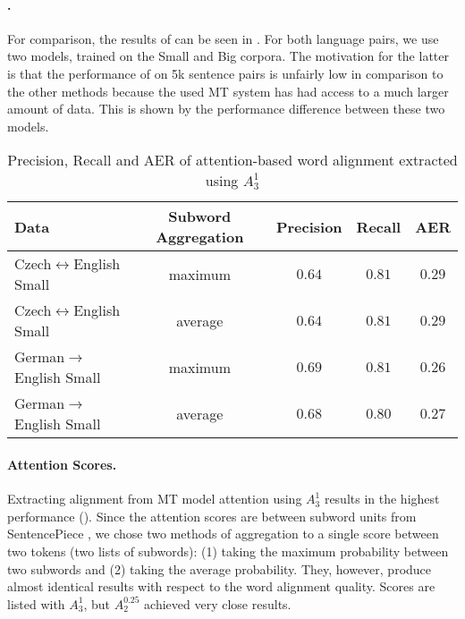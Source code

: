 \paragraph{\fastalign{}.} For comparison, the results of \fastalign{} can be seen in . For both language pairs, we use two models, trained on the Small and Big corpora. The motivation for the latter is that the performance of \fastalign{} on 5k sentence pairs is unfairly low in comparison to the other methods because the used MT system has had access to a much larger amount of data. This is shown by the performance difference between these two models.

\begin{table*}[h!]
    \vspace{0.5cm}
    \center
    \begin{tabular}{lcccc}
        \toprule
        Data & Subword Aggregation & Precision & Recall & AER \\
        \midrule
        Czech$\leftrightarrow$English Small & maximum & $0.64$ & $0.81$ & $0.29$ \\
        Czech$\leftrightarrow$English Small & average & $0.64$ & $0.81$ & $0.29$ \\
        German$\rightarrow$English Small\hspace*{-0.5cm}& maximum & $0.69$ & $0.81$ & $0.26$ \\
        German$\rightarrow$English Small\hspace*{-0.5cm}& average & $0.68$ & $0.80$ & $0.27$ \\
        \bottomrule
    \end{tabular}
    \caption{Precision, Recall and AER of attention-based word alignment extracted using $A_3^1$ \label{tab:individual_marian}}
\end{table*}


\paragraph{Attention Scores.} Extracting alignment from MT model attention using $A_3^1$ results in the highest performance (). Since the attention scores are between subword units from SentencePiece \citep{kudo2018sentencepiece}, we chose two methods of aggregation to a single score between two tokens (two lists of subwords): (1) taking the maximum probability between two subwords and (2) taking the average probability. They, however, produce almost identical results with respect to the word alignment quality. Scores are listed with $A_3^1$, but $A_2^{0.25}$ achieved very close results.

